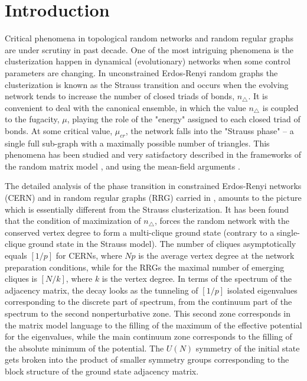 \documentclass[aps,12pt]{revtex4}
\begin{document}
\maketitle

\section{Introduction}

Critical phenomena in topological random networks and random regular graphs are under scrutiny in past decade. One of the most intriguing phenomena is the clusterization happen in dynamical (evolutionary) networks when some control parameters are changing. In unconstrained Erdos-Renyi random graphs the clusterization is known as the Strauss transition and occurs when the evolving network tends to increase the number of closed triads of bonds, $n_{\triangle}$. It is convenient to deal with the canonical ensemble, in which the value $n_{\triangle}$ is coupled to the fugacity, $\mu$, playing the role of the "energy" assigned to each closed triad of bonds. At some critical value, $\mu_{cr}$, the network falls into the "Strauss phase" -- a single full sub-graph with a maximally possible number of triangles. This phenomena has been studied and very satisfactory described in the frameworks of the random matrix model \cite{burda}, and using the mean-field arguments \cite{newman1}.

The detailed analysis of the phase transition in constrained Erdos-Renyi networks (CERN) and in random regular graphs (RRG) carried in \cite{decay}, amounts to the picture which is essentially different from the Strauss clusterization. It has been found that the condition of maximization of $n_{\triangle}$, forces the random network with the conserved vertex degree to form a multi-clique ground state (contrary to a single-clique ground state in the Strauss model). The number of cliques asymptotically equals $[1/p]$ for CERNs, where $Np$ is the average vertex degree at the network preparation conditions, while for the RRGs the maximal number of emerging cliques is $[N/k]$, where $k$ is the vertex degree. In terms of the spectrum of the adjacency matrix, the decay looks as the tunneling of $[1/p]$ isolated eigenvalues corresponding to the discrete part of spectrum, from the continuum part of the spectrum to the second nonperturbative zone. This second zone corresponds in the matrix model language to the filling of the maximum of the effective potential for the eigenvalues, while the main continuum zone corresponds to the filling of the absolute minimum of the potential. The $U(N)$ symmetry of the initial state gets broken into the product of smaller symmetry groups corresponding to the block structure of the ground state adjacency matrix.
\end{document}
